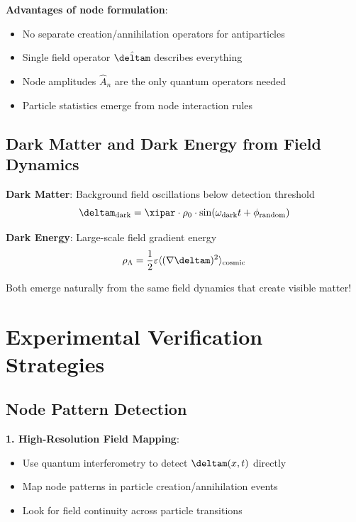 	\textbf{Advantages of node formulation}:
	\begin{itemize}
		\item No separate creation/annihilation operators for antiparticles
		\item Single field operator $\hat{\deltam}$ describes everything
		\item Node amplitudes $\hat{A}_n$ are the only quantum operators needed
		\item Particle statistics emerge from node interaction rules
	\end{itemize}
	
	\subsection{Dark Matter and Dark Energy from Field Dynamics}
	
	\textbf{Dark Matter}: Background field oscillations below detection threshold
	\begin{equation}
		\deltam_{\text{dark}} = \xipar \cdot \rho_0 \cdot \sin(\omega_{\text{dark}} t + \phi_{\text{random}})
	\end{equation}
	
	\textbf{Dark Energy}: Large-scale field gradient energy
	\begin{equation}
		\rho_{\Lambda} = \frac{1}{2} \varepsilon \langle (\nabla \deltam)^2 \rangle_{\text{cosmic}}
	\end{equation}
	
	Both emerge naturally from the same field dynamics that create visible matter!
	
	\section{Experimental Verification Strategies}
	
	\subsection{Node Pattern Detection}
	
	\textbf{1. High-Resolution Field Mapping}:
	\begin{itemize}
		\item Use quantum interferometry to detect $\deltam(x,t)$ directly
		\item Map node patterns in particle creation/annihilation events
		\item Look for field continuity across particle transitions
	\end{itemize}
	
